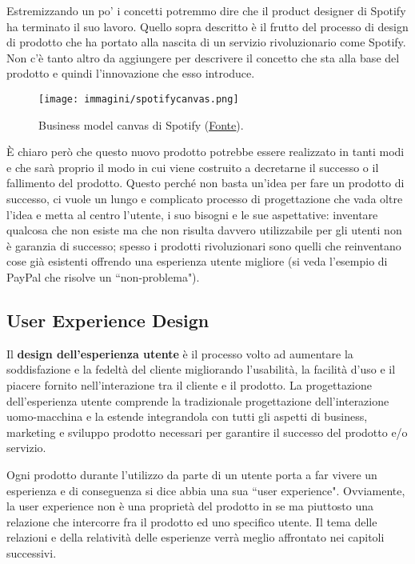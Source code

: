 Estremizzando un po' i concetti potremmo dire che il product designer di Spotify ha terminato il suo lavoro. Quello sopra descritto è il frutto del
processo di design di prodotto che ha portato alla nascita di un servizio rivoluzionario come Spotify. Non c'è tanto altro da aggiungere per descrivere
il concetto che sta alla base del prodotto e quindi l'innovazione che esso introduce.

\begin{figure}[!h]
	\centering
	\texttt{[image: immagini/spotifycanvas.png]}
	\caption{Business model canvas di Spotify (\href{http://lumosbusiness.com/business-model-canvas-spotify/}{\underline{Fonte}}).}
\end{figure}

\`E chiaro però che questo nuovo prodotto potrebbe essere realizzato in tanti modi e che sarà proprio il modo in cui viene costruito a decretarne il
successo o il fallimento del prodotto. Questo perché non basta un'idea per fare un prodotto di successo, ci vuole un lungo e complicato processo di
progettazione che vada oltre l'idea e metta al centro l'utente, i suo bisogni e le sue aspettative: inventare qualcosa che non esiste ma che non
risulta davvero utilizzabile per gli utenti non è garanzia di successo; spesso i prodotti rivoluzionari sono quelli che reinventano cose già
esistenti offrendo una esperienza utente migliore (si veda l'esempio di PayPal che risolve un ``non-problema").

\subsection{User Experience Design}
Il \textbf{design dell'esperienza utente} è il processo volto ad aumentare la soddisfazione e la fedeltà del cliente migliorando l'usabilità, la
facilità d'uso e il piacere fornito nell'interazione tra il cliente e il prodotto. La progettazione dell'esperienza utente comprende la tradizionale
progettazione dell'interazione uomo-macchina e la estende integrandola con tutti gli aspetti di business, marketing e sviluppo prodotto necessari per
garantire il successo del prodotto e/o servizio.


Ogni prodotto durante l'utilizzo da parte di un utente porta a far vivere un esperienza e di conseguenza si dice abbia una sua ``user experience".
Ovviamente, la user experience non è una proprietà del prodotto in se ma piuttosto una relazione che intercorre fra il prodotto ed uno specifico utente.
Il tema delle relazioni e della relatività delle esperienze verrà meglio affrontato nei capitoli successivi. 

